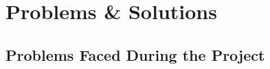 \chapter{Problems \& Solutions}\label{chap:problems}
\section{Problems Faced During the Project}











